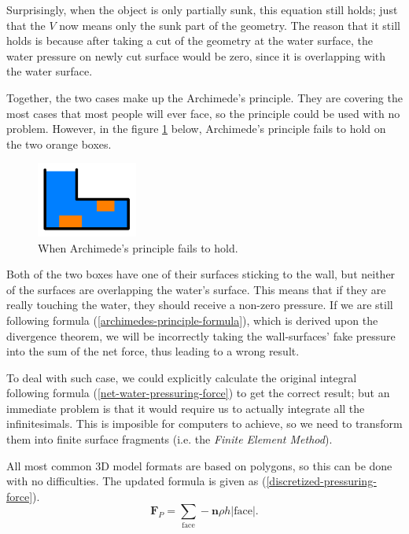 Surprisingly, when the object is only partially sunk, this equation still holds;
just that the $V$ now means only the sunk part of the geometry.
The reason that it still holds is because after taking a cut of the geometry at the water surface, the water pressure on newly cut surface would be zero, since it is overlapping with the water surface.

Together, the two cases make up the Archimede's principle.
They are covering the most cases that most people will ever face, so the principle could be used with no problem.
However, in the figure \ref{archimedes-principle-failing-case} below, Archimede's principle fails to hold on the two orange boxes.

\begin{figure}[h]
	\begin{center}
		\includegraphics[width=1.3in]{figures/ap-blind-spot.png}
	\end{center}
	\caption{When Archimede's principle fails to hold.}
	\label{archimedes-principle-failing-case}
\end{figure}

Both of the two boxes have one of their surfaces sticking to the wall, but neither of the surfaces are overlapping the water's surface.
This means that if they are really touching the water, they should receive a non-zero pressure.
If we are still following formula (\ref{archimedes-principle-formula}), which is derived upon the divergence theorem, we will be incorrectly taking the wall-surfaces' fake pressure into the sum of the net force, thus leading to a wrong result.

To deal with such case, we could explicitly calculate the original integral following formula (\ref{net-water-pressuring-force}) to get the correct result; but an immediate problem is that it would require us to actually integrate all the infinitesimals.
This is imposible for computers to achieve, so we need to transform them into finite surface fragments (i.e. the \emph{Finite Element Method}).

All most common 3D model formats are based on polygons, so this can be done with no difficulties.
The updated formula is given as (\ref{discretized-pressuring-force}).
\begin{equation}
	\mathbf{F}_P=\sum_{\text{face}}-\mathbf{n}\rho h|\text{face}|.
	\label{discretized-pressuring-force}
\end{equation}


